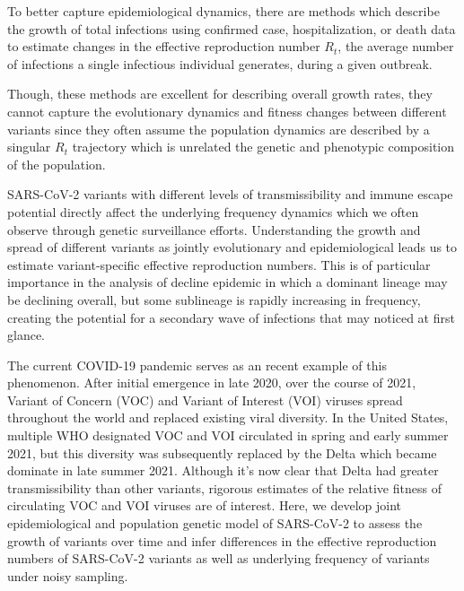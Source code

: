 \documentclass[11pt,oneside,letterpaper]{article}
\begin{document}

To better capture epidemiological dynamics, there are methods which describe the growth of total infections using confirmed case, hospitalization, or death data to estimate changes in the effective reproduction number $R_{t}$, the average number of infections a single infectious individual generates, during a given outbreak.

Though, these methods are excellent for describing overall growth rates, they cannot capture the evolutionary dynamics and fitness changes between different variants since they often assume the population dynamics are described by a singular $R_{t}$ trajectory \cite{Cori2013, Abbott2020} which is unrelated the genetic and phenotypic composition of the population. %

SARS-CoV-2 variants with different levels of transmissibility and immune escape potential directly affect the underlying frequency dynamics which we often observe through genetic surveillance efforts.
Understanding the growth and spread of different variants as jointly evolutionary and epidemiological leads us to estimate variant-specific effective reproduction numbers.
This is of particular importance in the analysis of decline epidemic in which a dominant lineage may be declining overall, but some sublineage is rapidly increasing in frequency, creating the potential for a secondary wave of infections that may noticed at first glance.


The current COVID-19 pandemic serves as an recent example of this phenomenon.
After initial emergence in late 2020, over the course of 2021, Variant of Concern (VOC) and Variant of Interest (VOI) viruses spread throughout the world and replaced existing viral diversity.
In the United States, multiple WHO designated \cite{Konings2021} VOC and VOI circulated in spring and early summer 2021, but this diversity was subsequently replaced by the Delta which became dominate in late summer 2021.
Although it's now clear that Delta had greater transmissibility than other variants, rigorous estimates of the relative fitness of circulating VOC and VOI viruses are of interest.
Here, we develop joint epidemiological and population genetic model of SARS-CoV-2 to assess the growth of variants over time and infer differences in the effective reproduction numbers of SARS-CoV-2 variants as well as underlying frequency of variants under noisy sampling.
\end{document}
